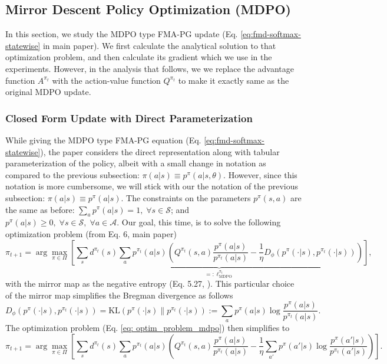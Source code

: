 \documentclass[a4paper, 10pt]{article}
\begin{document}
\subsection{Mirror Descent Policy Optimization (MDPO)}
In this section, we study the MDPO type FMA-PG update (Eq. \ref{eq:fmd-softmax-statewise} in main paper). We first calculate the analytical solution to that optimization problem, and then calculate its gradient which we use in the experiments. However, in the analysis that follows, we we replace the advantage function $A^{\pi_t}$ with the action-value function $Q^{\pi_t}$ to make it exactly same as the original MDPO \citep{tomar2020mirror} update.
\subsubsection{Closed Form Update with Direct Parameterization}
While giving the MDPO type FMA-PG equation (Eq. \ref{eq:fmd-softmax-statewise}), the paper considers the direct representation along with tabular parameterization of the policy, albeit with a small change in notation as compared to the previous subsection: $\pi(a|s) \equiv p^\pi(a|s, \theta)$. However, since this notation is more cumbersome, we will stick with our the notation of the previous subsection: $\pi(a|s) \equiv p^\pi(a|s)$. The constraints on the parameters $p^\pi(s, a)$ are the same as before: $\sum_a p^\pi(a | s) = 1, \; \forall s \in \mathcal{S}$; and $p^\pi(a | s) \geq 0, \; \forall s \in \mathcal{S}, \; \forall a \in \mathcal{A}$. Our goal, this time, is to solve the following optimization problem (from Eq. 6, main paper)
\begin{equation}
  \pi_{t+1} = \arg\max_{\pi \in \Pi} \underbrace{\left[ \sum_s d^{\pi_t}(s) \sum_a p^{\pi_t}(a|s) \left( Q^{\pi_t}(s, a) \frac{p^\pi(a | s)}{p^{\pi_t}(a | s)} - \frac{1}{\eta} D_\phi (p^\pi(\cdot | s), p^{\pi_t}(\cdot | s)) \right) \right]}_{=: \ell^{\pi_t}_{\text{MDPO}}}, \label{eq: optim_problem_mdpo}
\end{equation}
with the mirror map as the negative entropy (Eq. 5.27, \citet{beck2003mirror}). This particular choice of the mirror map simplifies the Bregman divergence as follows
\begin{equation}
  D_\phi (p^\pi(\cdot | s), p^{\pi_t}(\cdot | s)) = \text{KL}(p^\pi(\cdot | s) \| p^{\pi_t}(\cdot | s)) := \sum_a p^\pi(a | s) \log \frac{p^\pi(a | s)}{p^{\pi_t}(a | s)}.
\end{equation}
The optimization problem (Eq. \ref{eq: optim_problem_mdpo}) then simplifies to
\begin{equation}
  \pi_{t+1} = \arg\max_{\pi \in \Pi} \left[ \sum_s d^{\pi_t}(s) \sum_a p^{\pi_t}(a|s) \left( Q^{\pi_t}(s, a) \frac{p^\pi(a | s)}{p^{\pi_t}(a | s)} - \frac{1}{\eta} \sum_{a'} p^\pi(a' | s) \log \frac{p^\pi(a' | s)}{p^{\pi_t}(a' | s)} \right) \right].
\end{equation}
\end{document}
